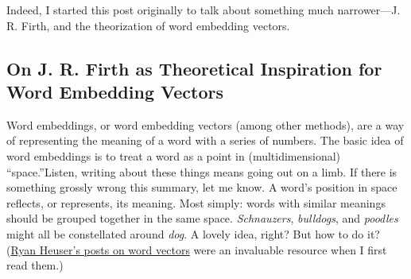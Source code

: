 \documentclass[
  12pt,
]{article}
\begin{document}
Indeed, I started this post originally to talk about something much
narrower---J. R. Firth, and the theorization of word embedding vectors.

\hypertarget{on-j.-r.-firth-as-theoretical-inspiration-for-word-embedding-vectors}{%
\subsection{On J. R. Firth as Theoretical Inspiration for Word Embedding
Vectors}\label{on-j.-r.-firth-as-theoretical-inspiration-for-word-embedding-vectors}}

Word embeddings, or word embedding vectors (among other methods), are a
way of representing the meaning of a word with a series of numbers. The
basic idea of word embeddings is to treat a word as a point in
(multidimensional) ``space.''{Listen, writing about these things means
going out on a limb. If there is something grossly wrong this summary,
let me know.} A word's position in space reflects, or represents, its
meaning. Most simply: words with similar meanings should be grouped
together in the same space. \emph{Schnauzers}, \emph{bulldogs}, and
\emph{poodles} might all be constellated around \emph{dog}. A lovely
idea, right? But how to do it?
(\href{https://ryanheuser.org/word-vectors/}{Ryan Heuser's posts on word
vectors} were an invaluable resource when I first read them.)
\end{document}
